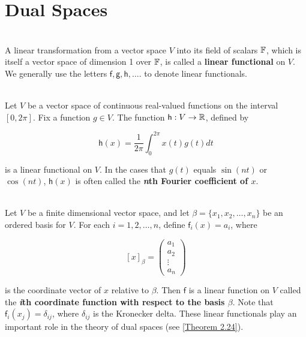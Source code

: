 \section{Dual Spaces}

\begin{definition}
	\hfill\\
	A linear transformation from a vector space $V$ into its field of scalars $\mathbb{F}$, which is itself a vector space of dimension 1 over $\mathbb{F}$, is called a \textbf{linear functional} on $V$. We generally use the letters $\mathsf{f}, \mathsf{g}, \mathsf{h}, \dots$. to denote linear functionals.
\end{definition}

\begin{definition}
	\hfill\\
	Let $V$ be a vector space of continuous real-valued functions on the interval $[0, 2\pi]$. Fix a function $g \in V$. The function $\mathsf{h}: V \to \mathbb{R}$, defined by

	\[\mathsf{h}(x) = \frac{1}{2\pi} \int_{0}^{2\pi}x(t)g(t) dt\]

	is a linear functional on $V$. In the cases that $g(t)$ equals $\sin(nt)$ or $\cos (nt)$, $\mathsf{h}(x)$ is often called the \textbf{\textit{n}th Fourier coefficient of $x$}.
\end{definition}

\begin{definition}
	\hfill\\
	Let $V$ be a finite dimensional vector space, and let $\beta = \{x_1, x_2, \dots, x_n\}$ be an ordered basis for $V$. For each $i = 1, 2, \dots, n$, define $\mathsf{f}_i(x) = a_i$, where

	\[[x]_\beta = \begin{pmatrix} a_1 \\ a_2 \\ \vdots \\ a_n \end{pmatrix}\]

	is the coordinate vector of $x$ relative to $\beta$. Then $\mathsf{f}$ is a linear function on $V$ called the \textbf{\textit{i}th coordinate function with respect to the basis $\beta$}. Note that $\mathsf{f}_i(x_j) = \delta_{ij}$, where $\delta_{ij}$ is the Kronecker delta. These linear functionals play an important role in the theory of dual spaces (see \autoref{Theorem 2.24}).
\end{definition}

